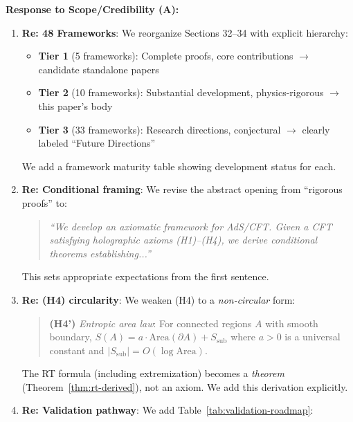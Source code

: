 \documentclass[12pt,a4paper]{article}
\begin{document}
\begin{tcolorbox}[colback=blue!5!white, colframe=blue!75!black, title=\textbf{BLUE TEAM Round 5: Strategic Responses}]

\textbf{Response to Scope/Credibility (A):}

\begin{enumerate}[label=\textbf{B5.\arabic*.}]
    \item \textbf{Re: 48 Frameworks}: We reorganize Sections 32--34 with explicit hierarchy:
    \begin{itemize}
        \item \textbf{Tier 1} (5 frameworks): Complete proofs, core contributions $\to$ candidate standalone papers
        \item \textbf{Tier 2} (10 frameworks): Substantial development, physics-rigorous $\to$ this paper's body
        \item \textbf{Tier 3} (33 frameworks): Research directions, conjectural $\to$ clearly labeled ``Future Directions''
    \end{itemize}
    We add a framework maturity table showing development status for each.
    
    \item \textbf{Re: Conditional framing}: We revise the abstract opening from ``rigorous proofs'' to:
    \begin{quote}
    \emph{``We develop an axiomatic framework for AdS/CFT. Given a CFT satisfying holographic axioms (H1)--(H4), we derive conditional theorems establishing...''}
    \end{quote}
    This sets appropriate expectations from the first sentence.
    
    \item \textbf{Re: (H4) circularity}: We weaken (H4) to a \emph{non-circular} form:
    \begin{quote}
    \textbf{(H4')} \emph{Entropic area law}: For connected regions $A$ with smooth boundary, $S(A) = a \cdot \text{Area}(\partial A) + S_{\text{sub}}$ where $a > 0$ is a universal constant and $|S_{\text{sub}}| = O(\log\text{Area})$.
    \end{quote}
    The RT formula (including extremization) becomes a \emph{theorem} (Theorem~\ref{thm:rt-derived}), not an axiom. We add this derivation explicitly.
    
    \item \textbf{Re: Validation pathway}: We add Table~\ref{tab:validation-roadmap}:
    

\end{enumerate}
\end{tcolorbox}
\end{document}
